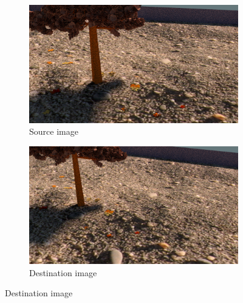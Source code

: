 \documentclass[fleqn,10pt]{SelfArx} %
\begin{document}
\begin{figure}
        \begin{subfigure}[b]{0.35\textwidth}
        		\centering
                \includegraphics[width=\linewidth]{Figures/GroundDetection_with_ImagePair/im1(1)0001.png}
                \caption{Source image}
                \label{fig:GPSource}
        \end{subfigure}%
        \begin{subfigure}[b]{0.35\textwidth}
        		\centering
                \includegraphics[width=\linewidth]{Figures/GroundDetection_with_ImagePair/im1(2)0001.png}
                \caption{Destination image}
                \label{fig:GPDest}
        \end{subfigure}%
        

\end{figure}
\end{document}
